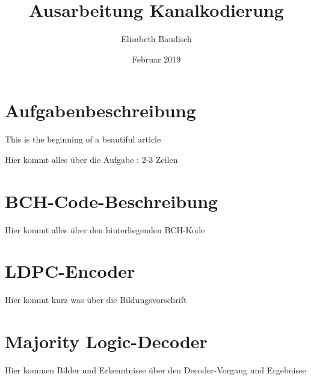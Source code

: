 \documentclass[11pt,a4paper]{article}
\begin{document}
\title{Ausarbeitung Kanalkodierung}
\author{Elisabeth Baudisch}
\date{Februar 2019}
\maketitle

\section{Aufgabenbeschreibung}
This is the beginning of a beautiful article

Hier kommt alles über die Aufgabe :
2-3 Zeilen

\section{BCH-Code-Beschreibung}
Hier kommt alles über den hinterliegenden BCH-Kode

\section{LDPC-Encoder}
Hier kommt kurz was über die Bildungsvorschrift

\section{Majority Logic-Decoder}
Hier kommen Bilder und Erkenntnisse über den Decoder-Vorgang und Ergebnisse
\end{document}
